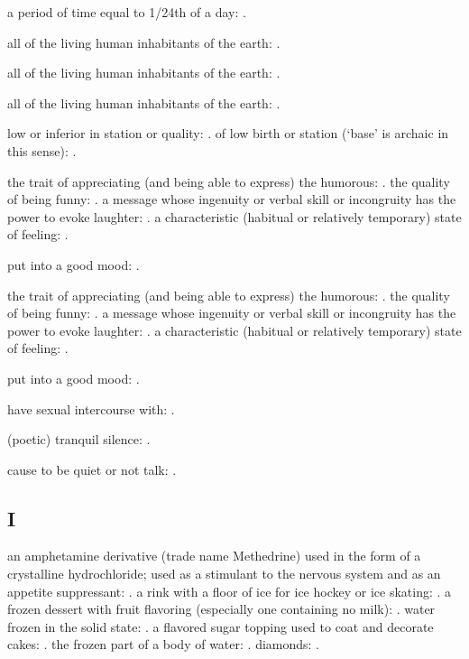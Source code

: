   a period of time equal to 1/24th of a day: .

  all of the living human inhabitants of the earth: .

  all of the living human inhabitants of the earth: .

  all of the living human inhabitants of the earth: .

  low or inferior in station or quality: . of low birth or station (`base' is archaic in this sense): .

  the trait of appreciating (and being able to express) the humorous: . the quality of being funny: . a message whose ingenuity or verbal skill or incongruity has the power to evoke laughter: . a characteristic (habitual or relatively temporary) state of feeling: .

  put into a good mood: .

  the trait of appreciating (and being able to express) the humorous: . the quality of being funny: . a message whose ingenuity or verbal skill or incongruity has the power to evoke laughter: . a characteristic (habitual or relatively temporary) state of feeling: .

  put into a good mood: .

  have sexual intercourse with: .

  (poetic) tranquil silence: .

  cause to be quiet or not talk: .

\subsection*{I}

  an amphetamine derivative (trade name Methedrine) used in the form of a crystalline hydrochloride; used as a stimulant to the nervous system and as an appetite suppressant: . a rink with a floor of ice for ice hockey or ice skating: . a frozen dessert with fruit flavoring (especially one containing no milk): . water frozen in the solid state: . a flavored sugar topping used to coat and decorate cakes: . the frozen part of a body of water: . diamonds: .

